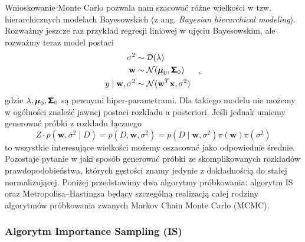 \documentclass{myclass}
\begin{document}
Wnioskowanie Monte Carlo pozwala nam szacować różne wielkości w tzw. hierarchicznych modelach
Bayesowskich (z ang. \textit{Bayesian hierarchical modeling}). Rozważmy jeszcze raz przykład
regresji liniowej w ujęciu Bayesowskim, ale rozważmy teraz model postaci
\begin{equation*}
    \begin{split}
        \sigma^2 &\sim \mathcal{D}(\lambda)\\
        \mathbf{w} &\sim \mathcal{N}(\boldsymbol{\mu}_0, \boldsymbol{\mathsf{\Sigma}}_0)\\
        y \mid \mathbf{w}, \sigma^2 &\sim \mathcal{N}(\mathbf{w}^T\mathbf{x}, \sigma^2)
    \end{split}\quad,
\end{equation*}
gdzie \(\lambda, \boldsymbol{\mu}_0, \boldsymbol{\mathsf{\Sigma}}_0\) są pewnymi hiper-parametrami. Dla takiego
modelu nie możemy w ogólności znaleźć jawnej postaci rozkładu a posteriori. Jeśli jednak umiemy
generować próbki z rozkładu łącznego
\begin{equation*}
    Z\cdot p(\mathbf{w}, \sigma^2 \mid D) = p(D, \mathbf{w}, \sigma^2) = p(D \mid \mathbf{w},\sigma^2)\pi(\mathbf{w})\pi(\sigma^2)
\end{equation*}
to wszystkie interesujące wielkości możemy oszacować jako odpowiednie średnie. Pozostaje pytanie w
jaki sposób generować próbki ze skomplikowanych rozkładów prawdopodobieństwa, których gęstości znamy
jedynie z dokładnością do stałej normalizującej. Poniżej przedstawimy dwa algorytmy próbkowania:
algorytm IS oraz Metropolisa--Hastingsa będący szczególną realizacją całej rodziny algorytmów
próbkowania zwanych Markov Chain Monte Carlo (MCMC).

\subsubsection{Algorytm Importance Sampling (IS)}
\end{document}
